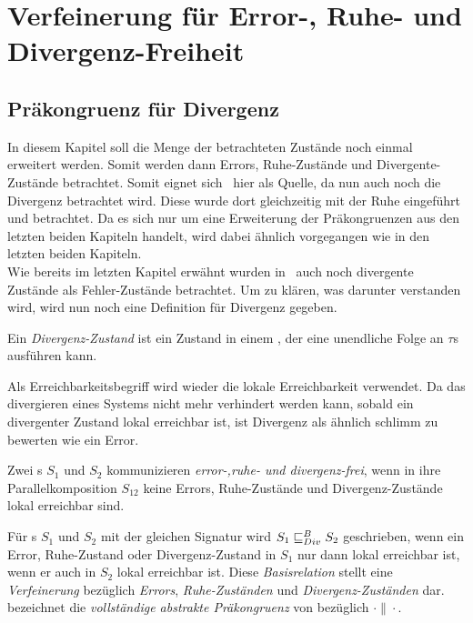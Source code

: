 \chapter{Verfeinerung für Error-, Ruhe- und Divergenz-Freiheit}

\section{Präkongruenz für Divergenz}

In diesem Kapitel soll die Menge der betrachteten Zustände noch einmal
erweitert werden. Somit werden dann Errors, Ruhe-Zustände und
Divergente-Zustände betrachtet. Somit eignet sich~\cite{Chilton2013} hier als
Quelle, da nun auch noch die Divergenz betrachtet wird. Diese wurde dort
gleichzeitig mit der Ruhe eingeführt und betrachtet. Da es sich nur um eine
Erweiterung der Präkongruenzen aus den letzten beiden Kapiteln handelt, wird
dabei ähnlich vorgegangen wie in den letzten beiden Kapiteln.\\
Wie bereits im letzten Kapitel erwähnt wurden in~\cite{Chilton2013} auch noch
divergente Zustände als Fehler-Zustände betrachtet. Um zu klären, was darunter
verstanden wird, wird nun noch eine Definition für Divergenz gegeben.

\begin{Def}[Divergenz]
  Ein \emph{Divergenz-Zustand} ist ein Zustand in einem \EIO{}, der eine
  unendliche Folge an $\tau$s ausführen kann. %
\end{Def}

Als Erreichbarkeitsbegriff wird wieder die lokale Erreichbarkeit verwendet.
Da das divergieren eines Systems nicht mehr verhindert werden kann, sobald ein
divergenter Zustand lokal erreichbar ist, ist Divergenz als ähnlich
\glqq{}schlimm\grqq{} zu bewerten wie ein Error.

\begin{Def}
  Zwei \EIO{}s $S_1$ und $S_2$ kommunizieren \emph{error-,ruhe- und
  divergenz-frei}, wenn in ihre Parallelkomposition $S_{12}$ keine Errors,
  Ruhe-Zustände und Divergenz-Zustände lokal erreichbar sind.
\end{Def}

\begin{Def}
Für \EIO{}s $S_1$ und $S_2$ mit der gleichen Signatur wird $S_1\sqsubseteq _{Div}^B S_2$
geschrieben, wenn ein Error, Ruhe-Zustand oder Divergenz-Zustand in $S_1$ nur
dann lokal erreichbar ist, wenn er auch in $S_2$ lokal erreichbar ist. Diese
\emph{Basisrelation} stellt eine \emph{Verfeinerung} bezüglich \emph{Errors},
\emph{Ruhe-Zuständen} und \emph{Divergenz-Zuständen} dar.\\
\DCRel{} bezeichnet die \emph{vollständige abstrakte Präkongruenz} von \DBRel{}
bezüglich $\cdot\|\cdot$.
\end{Def}

